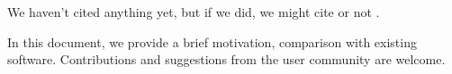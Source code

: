 We haven't cited anything yet, but if we did, we might cite
\citet{guy07a} or not \citep{guy05a}.

In this document, we provide a brief motivation, comparison with
existing software. Contributions and suggestions from the user
community are welcome.
